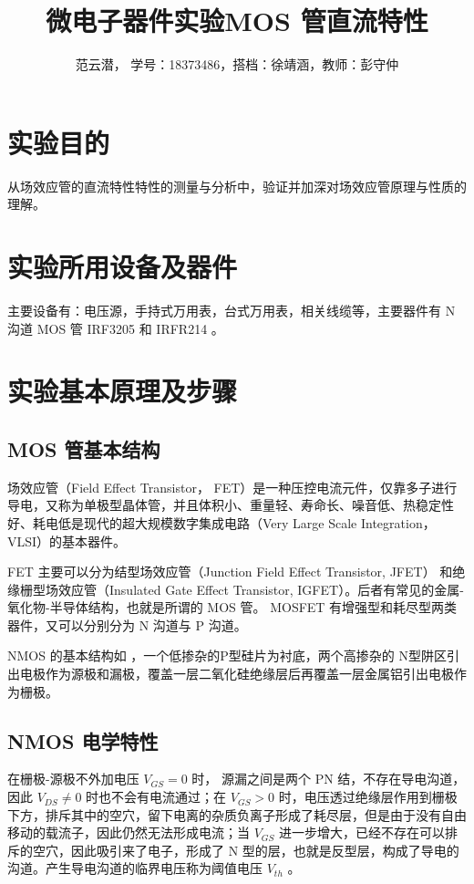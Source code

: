 \documentclass[lang=cn,11pt,a4paper,cite=authoryear]{elegantpaper}
\title{微电子器件实验\quad MOS 管直流特性}
\author{范云潜， 学号：18373486，搭档：徐靖涵，教师：彭守仲}
\institute{微电子学院 184111 班}
\date{\zhdate{2020/10/19}}
\begin{document}
\maketitle


\section{实验目的}

从场效应管的直流特性特性的测量与分析中，验证并加深对场效应管原理与性质的理解。

\section{实验所用设备及器件}

主要设备有：电压源，手持式万用表，台式万用表，相关线缆等，主要器件有 N 沟道 MOS 管 IRF3205 和 IRFR214 。

\section{实验基本原理及步骤}

\subsection{MOS 管基本结构}

场效应管（Field Effect Transistor， FET）是一种压控电流元件，仅靠多子进行导电，又称为单极型晶体管，并且体积小、重量轻、寿命长、噪音低、热稳定性好、耗电低是现代的超大规模数字集成电路（Very Large Scale Integration， VLSI）的基本器件。

FET 主要可以分为结型场效应管（Junction Field Effect Transistor, JFET） 和绝缘栅型场效应管（Insulated Gate Effect Transistor, IGFET）。后者有常见的金属-氧化物-半导体结构，也就是所谓的 MOS 管。 MOSFET 有增强型和耗尽型两类器件，又可以分别分为 N 沟道与 P 沟道。

NMOS 的基本结构如  ，一个低掺杂的P型硅片为衬底，两个高掺杂的 N型阱区引出电极作为源极和漏极，覆盖一层二氧化硅绝缘层后再覆盖一层金属铝引出电极作为栅极。


\subsection{NMOS 电学特性} 

在栅极-源极不外加电压 \(V_{GS} = 0\) 时， 源漏之间是两个 PN 结，不存在导电沟道，因此 \(V_{DS} \neq 0\) 时也不会有电流通过；在 \(V_{GS} > 0\) 时，电压透过绝缘层作用到栅极下方，排斥其中的空穴，留下电离的杂质负离子形成了耗尽层，但是由于没有自由移动的载流子，因此仍然无法形成电流；当 \(V_{GS}\) 进一步增大，已经不存在可以排斥的空穴，因此吸引来了电子，形成了 N 型的层，也就是反型层，构成了导电的沟道。产生导电沟道的临界电压称为阈值电压 \(V_{th}\) 。
\end{document}
